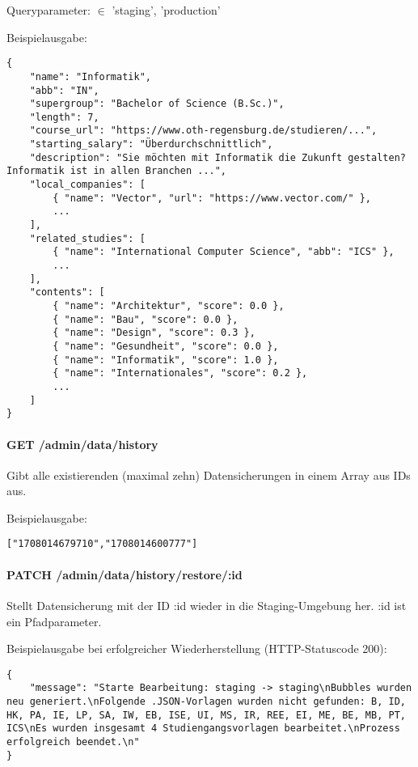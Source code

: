 \noindent
Queryparameter:  $\in$ {'staging', 'production'}

\noindent
Beispielausgabe:

\begin{lstlisting}[style=Python]
{
    "name": "Informatik",
    "abb": "IN",
    "supergroup": "Bachelor of Science (B.Sc.)",
    "length": 7,
    "course_url": "https://www.oth-regensburg.de/studieren/...",
    "starting_salary": "Überdurchschnittlich",
    "description": "Sie möchten mit Informatik die Zukunft gestalten? Informatik ist in allen Branchen ...",
    "local_companies": [
        { "name": "Vector", "url": "https://www.vector.com/" },
        ...
    ],
    "related_studies": [
        { "name": "International Computer Science", "abb": "ICS" },
        ...
    ],
    "contents": [
        { "name": "Architektur", "score": 0.0 },
        { "name": "Bau", "score": 0.0 },
        { "name": "Design", "score": 0.3 },
        { "name": "Gesundheit", "score": 0.0 },
        { "name": "Informatik", "score": 1.0 },
        { "name": "Internationales", "score": 0.2 },
        ...
    ]
}
\end{lstlisting}

\paragraph*{GET /admin/data/history}
\vspace{-1.0em}
Gibt alle existierenden (maximal zehn) Datensicherungen in einem Array aus IDs aus.

\noindent
Beispielausgabe:
\begin{lstlisting}[style=Python]
    ["1708014679710","1708014600777"]
\end{lstlisting}

\paragraph*{PATCH /admin/data/history/restore/:id}
\vspace{-1.0em}
Stellt Datensicherung mit der ID :id wieder in die Staging-Umgebung her. :id ist ein Pfadparameter.

\noindent
Beispielausgabe bei erfolgreicher Wiederherstellung (HTTP-Statuscode 200):
\begin{lstlisting}[style=Python]
{
    "message": "Starte Bearbeitung: staging -> staging\nBubbles wurden neu generiert.\nFolgende .JSON-Vorlagen wurden nicht gefunden: B, ID, HK, PA, IE, LP, SA, IW, EB, ISE, UI, MS, IR, REE, EI, ME, BE, MB, PT, ICS\nEs wurden insgesamt 4 Studiengangsvorlagen bearbeitet.\nProzess erfolgreich beendet.\n"
}
\end{lstlisting}

